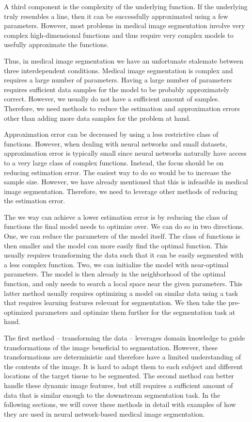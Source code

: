 A third component is the complexity of the underlying function. If the underlying truly resembles a line, then it can be successfully approximated using a few parameters. However, most problems in medical image segmentation involve very complex high-dimensional functions and thus require very complex models to usefully approximate the functions. 

Thus, in medical image segmentation we have an unfortunate stalemate between three interdependent conditions. Medical image segmentation is complex and requires a large number of parameters. Having a large number of parameters requires sufficient data samples for the model to be probably approximately correct. However, we usually do not have a sufficient amount of samples. Therefore, we need methods to reduce the estimation and approximation errors other than adding more data samples for the problem at hand.

Approximation error can be decreased by using a less restrictive class of functions. However, when dealing with neural networks and small datasets, approximation error is typically small since neural networks naturally have access to a very large class of complex functions. Instead, the focus should be on reducing estimation error. The easiest way to do so would be to increase the sample size. However, we have already mentioned that this is infeasible in medical image segmentation. Therefore, we need to leverage other methods of reducing the estimation error.

The we way can achieve a lower estimation error is by reducing the class of functions the final model needs to optimize over. We can do so in two directions. One, we can reduce the parameters of the model itself. The class of functions is then smaller and the model can more easily find the optimal function. This usually requires transforming the data such that it can be easily segmented with a less complex function. Two, we can initialize the model with near-optimal parameters. The model is then already in the neighborhood of the optimal function, and only needs to search a local space near the given parameters. This latter method usually requires optimizing a model on similar data using a task that requires learning features relevant for segmentation. We then take the pre-optimized parameters and optimize them further for the segmentation task at hand.

The first method -- transforming the data -- leverages domain knowledge to guide transformations of the image beneficial to segmentation. However, these transformations are deterministic and therefore have a limited understanding of the contents of the image. It is hard to adapt them to each subject and different locations of the target tissue to be segmented. The second method can better handle these dynamic image features, but still requires a sufficient amount of data that is similar enough to the downstream segmentation task. In the following sections, we will cover these methods in detail with examples of how they are used in neural network-based medical image segmentation.

